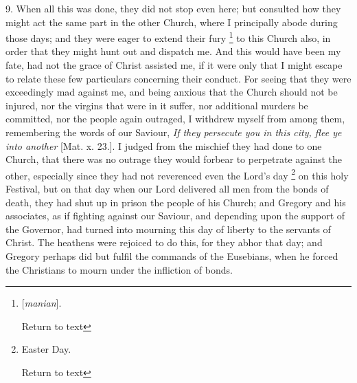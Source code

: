 9. When all this was done, they did not stop even
here; but consulted how they might act the same part in the other Church, where I principally abode during those days; and they were
eager to extend their fury \footnote{[\emph{manian}].

Return to text}
to this Church also, in order that they might hunt out and dispatch
me. And this would have been my fate, had not the grace of Christ
assisted me, if it were only that I might escape to relate these few
particulars concerning their conduct. For seeing that they were
exceedingly mad against me, and being anxious that the Church should
not be injured, nor the virgins that were in it suffer, nor additional
murders be committed, nor the people again outraged, I withdrew myself
from among them, remembering the words of our Saviour, \emph{If they
persecute you in this city, flee ye into another} [Mat. x. 23.]. I
judged from the mischief they had done to one Church, that there was
no outrage they would forbear to perpetrate against the other,
especially since they had not reverenced even the Lord's day \footnote{Easter Day.

Return to text} on this holy Festival, but on that day when our Lord delivered
all men from the bonds of death, they had shut up in prison the people
of his Church; and Gregory and his associates, as if fighting against
our Saviour, and depending upon the support of the Governor, had
turned into mourning this day of liberty to the servants of Christ.
The heathens were rejoiced to do this, for they abhor that day; and
Gregory perhaps did but fulfil the commands of the Eusebians, when he
forced the Christians to mourn under the infliction of bonds.

